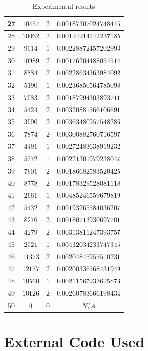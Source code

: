\documentclass[10pt,a4paper]{article}
\begin{document}
\begin{center}
\begin{table}[!h]
\begin{tabular}{|c|c|c|c|}
			27&$10454$&$2$&$0.00187307024748445$ \\ \hline
			28&$10662$&$2$&$0.00194914242237185$ \\ \hline
			29&$9014$&$1$&$0.00228872457202993$ \\ \hline
			30&$10989$&$2$&$0.00176204488054514$ \\ \hline
			31&$8884$&$2$&$0.00228634363984092$ \\ \hline
			32&$5190$&$1$&$0.00236850564785098$ \\ \hline
			33&$7983$&$2$&$0.00187994303893711$ \\ \hline
			34&$5424$&$2$&$0.00320881566106691$ \\ \hline
			35&$3990$&$2$&$0.00363480957548286$ \\ \hline
			36&$7874$&$2$&$0.00300882760716597$ \\ \hline
			37&$4491$&$1$&$0.00272483638919232$ \\ \hline
			38&$5372$&$1$&$0.00221301979238047$ \\ \hline
			39&$7901$&$2$&$0.00186682583520425$ \\ \hline
			40&$8778$&$2$&$0.00178329528081118$ \\ \hline
			41&$2661$&$1$&$0.00485246559679819$ \\ \hline
			42&$5432$&$2$&$0.00193265584036207$ \\ \hline
			43&$8276$&$2$&$0.00180713930697701$ \\ \hline
			44&$4279$&$2$&$0.00313811247393757$ \\ \hline
			45&$2021$&$1$&$0.00432034233747345$ \\ \hline
			46&$11373$&$2$&$0.00204845955510231$ \\ \hline
			47&$12157$&$2$&$0.00200336568431949$ \\ \hline
			48&$10560$&$1$&$0.00211567933625873$ \\ \hline
			49&$10126$&$2$&$0.00260783666198434$ \\ \hline
			50&$0$&$0$&$N/A$ \\ \hline
		\end{tabular}
		\caption{ \small Experimental results}
	\end{table}  
\end{center}



\appendix

\hspace{20pt}

\section{External Code Used}
\end{document}
